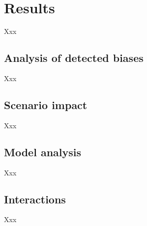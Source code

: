 \section{Results}
Xxx

\subsection{Analysis of detected biases}
Xxx

\subsection{Scenario impact}
Xxx

\subsection{Model analysis}
Xxx

\subsection{Interactions}
Xxx
